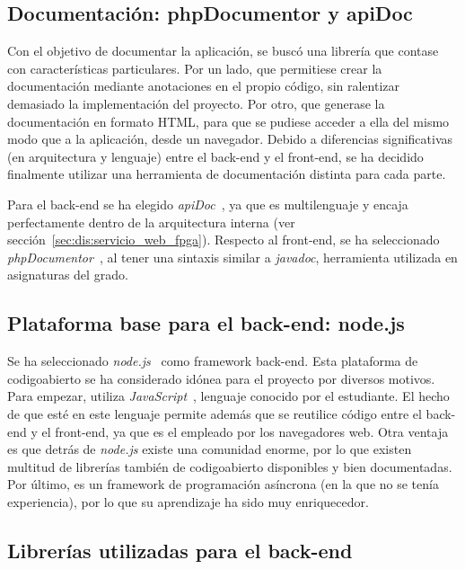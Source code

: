 \subsection*{Documentación: phpDocumentor y apiDoc\label{ssec:dp:docs}}

Con el objetivo de documentar la aplicación, se buscó una librería que contase con características particulares.
Por un lado, que permitiese crear la documentación mediante anotaciones en el propio código, sin ralentizar demasiado la implementación del proyecto.
Por otro, que generase la documentación en formato \gls{HTML}, para que se pudiese acceder a ella del mismo modo que a la aplicación, desde un navegador.
Debido a diferencias significativas (en arquitectura y lenguaje) entre el \gls{back-end} y el \gls{front-end}, se ha decidido finalmente utilizar una herramienta de documentación distinta para cada parte.

Para el \gls{back-end} se ha elegido \textit{apiDoc}~\cite{apidoc}, ya que es multilenguaje y encaja perfectamente dentro de la arquitectura interna (ver sección~\ref{sec:dis:servicio_web_fpga}).
Respecto al \gls{front-end}, se ha seleccionado \textit{phpDocumentor}~\cite{phpdocumentor}, al tener una sintaxis similar a \textit{javadoc}, herramienta utilizada en asignaturas del grado.

\subsection*{Plataforma base para el back-end: node.js\label{ssec:dp:back-end}}

Se ha seleccionado \textit{node.js}~\cite{nodejs} como \gls{framework} \gls{back-end}.
Esta plataforma de \gls{codigoabierto} se ha considerado idónea para el proyecto por diversos motivos.
Para empezar, utiliza \textit{JavaScript}~\cite{javascript}, lenguaje conocido por el estudiante.
El hecho de que esté en este lenguaje permite además que se reutilice código entre el \gls{back-end} y el \gls{front-end}, ya que es el empleado por los navegadores web.
Otra ventaja es que detrás de \textit{node.js} existe una comunidad enorme, por lo que existen multitud de librerías también de \gls{codigoabierto} disponibles y bien documentadas.
Por último, es un \gls{framework} de programación asíncrona (en la que no se tenía experiencia), por lo que su aprendizaje ha sido muy enriquecedor.

\subsection*{Librerías utilizadas para el back-end\label{ssec:dp:back-end-libs}}

